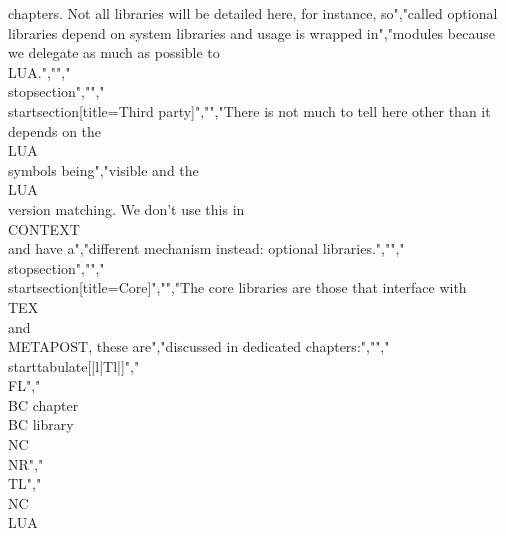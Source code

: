 chapters. Not all libraries will be detailed here, for instance, so","called optional libraries depend on system libraries and usage is wrapped in","modules because we delegate as much as possible to \\LUA.","","\\stopsection","","\\startsection[title={Third party}]","","There is not much to tell here other than it depends on the \\LUA\\ symbols being","visible and the \\LUA\\ version matching. We don't use this in \\CONTEXT\\ and have a","different mechanism instead: optional libraries.","","\\stopsection","","\\startsection[title={Core}]","","The core libraries are those that interface with \\TEX\\ and \\METAPOST, these are","discussed in dedicated chapters:","","\\starttabulate[|l|Tl|]","\\FL","\\BC chapter   \\BC library          \\NC \\NR","\\TL","\\NC \\LUA   